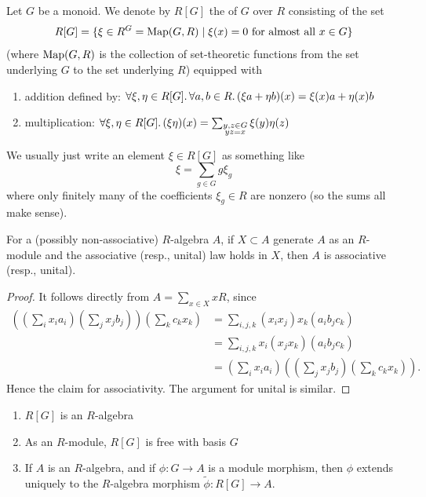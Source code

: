 \begin{definition}\label{defn:1.2}
Let $G$ be a monoid. We denote by $R[G]$ the 
of $G$ over $R$ consisting of the set
\begin{equation}
R[G]=\{\xi\in R^{G}=\operatorname{Map}(G,R)\mid\xi(x)=0\mbox{ for almost all }x\in G\}
\end{equation}
(where $\operatorname{Map}(G,R)$ is the collection of set-theoretic functions from the set
underlying $G$ to the set underlying $R$) equipped with
\begin{enumerate}
\item addition defined by: $\forall\xi,\eta\in R[G]\ldotp\forall a,b\in R\ldotp (\xi a+\eta b)(x)=\xi(x)a+\eta(x)b$
\item multiplication: $\forall\xi,\eta\in R[G]\ldotp (\xi\eta)(x)=\sum_{\substack{y,z\in G\\ yz=x}}\xi(y)\eta(z)$
\end{enumerate}
We usually just write an element $\xi\in R[G]$ as something like
\begin{equation}
\xi = \sum_{g\in G}g\xi_{g}
\end{equation}
where only finitely many of the coefficients $\xi_{g}\in R$ are
nonzero (so the sums all make sense).
\end{definition}

\begin{lemma}\label{lemma:1.3}
For a (possibly non-associative) $R$-algebra $A$, if $X\subset A$
generate $A$ as an $R$-module and the associative (resp., unital) law
holds in $X$, then $A$ is associative (resp., unital).
\end{lemma}

\begin{proof}
It follows directly from $A=\sum_{x\in X}xR$,
since
\begin{subequations}
  \begin{align}
\left((\sum_{i}x_{i}a_{i})(\sum_{j}x_{j}b_{j})\right)(\sum_{k}c_{k}x_{k})
&=\sum_{i,j,k}(x_{i}x_{j})x_{k}(a_{i}b_{j}c_{k})\\
&=\sum_{i,j,k}x_{i}(x_{j}x_{k})(a_{i}b_{j}c_{k})\\
&=(\sum_{i}x_{i}a_{i})\left((\sum_{j}x_{j}b_{j})(\sum_{k}c_{k}x_{k})\right).
  \end{align}
\end{subequations}
Hence the claim for associativity. The argument for unital is similar.
\end{proof}

\begin{proposition}\label{prop:1.4}
\begin{enumerate}
\item\label{item:1.4:1} $R[G]$ is an $R$-algebra
\item\label{item:1.4:2} As an $R$-module, $R[G]$ is free with basis $G$
\item\label{item:1.4:3} If $A$ is an $R$-algebra, and if $\phi\colon G\to A$ is a module
  morphism, then $\phi$ extends uniquely to the $R$-algebra morphism
  $\widetilde{\phi}\colon R[G]\to A$.
\end{enumerate}
\end{proposition}

